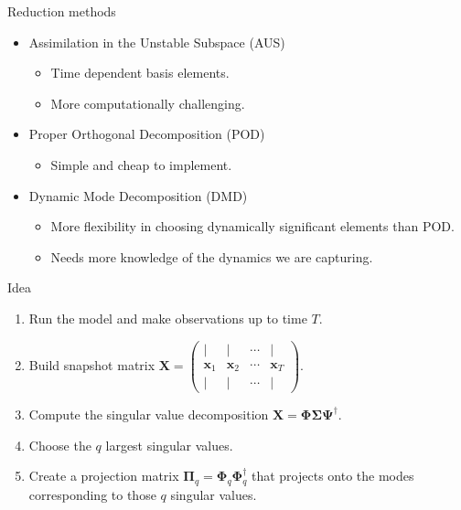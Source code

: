 \documentclass[aspectratio=169]{beamer}
\newcommand{\state}{\boldsymbol{x}}
\newcommand{\snapshot}{\boldsymbol{X}}
\begin{document}

\begin{frame}{Reduction methods}
\vfill
    \begin{itemize}
    \pause
        \item Assimilation in the Unstable Subspace (AUS) 
        \begin{itemize}
            \item Time dependent basis elements.
            \item More computationally challenging.
        \end{itemize}
    \pause
        \item Proper Orthogonal Decomposition (POD) 
        \begin{itemize}
            \item Simple and cheap to implement.
        \end{itemize}
    \pause
        \item Dynamic Mode Decomposition (DMD) 
        \begin{itemize}
            \item More flexibility in choosing dynamically significant elements than POD.
            \item Needs more knowledge of the dynamics we are capturing.
        \end{itemize}
    \end{itemize}
\vfill
\end{frame}


\begin{frame}{Idea}
\vfill
    \begin{enumerate}[1.]
    \pause
        \item Run the model and make observations up to time $T$.
    \pause
        \item Build snapshot matrix $\snapshot = \begin{pmatrix} \vert & \vert & \cdots & \vert \\ \state_1 & \state_2 & \cdots & \state_T \\ \vert & \vert & \cdots & \vert\end{pmatrix}$.
    \pause
        \item Compute the singular value decomposition $\snapshot = \boldsymbol{\Phi \Sigma \Psi}^\dagger$.
    \pause
        \item Choose the $q$ largest singular values. 
    \pause
        \item Create a projection matrix $\boldsymbol{\Pi}_q = \boldsymbol{\Phi}_q \boldsymbol{\Phi}_q^\dagger$ that projects onto the modes corresponding to those $q$ singular values.
    \pause
    \end{enumerate}
\vfill
\end{frame}
\end{document}
